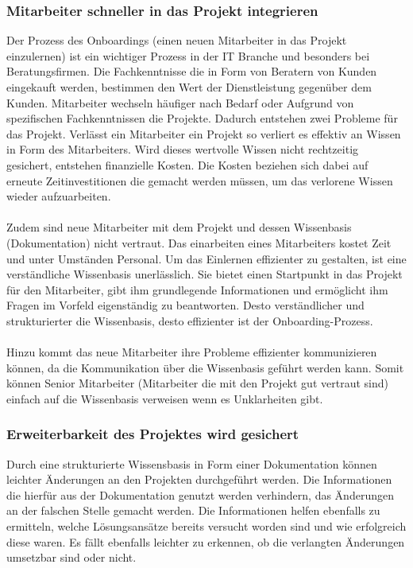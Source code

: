 \documentclass[a4paper,12pt]{scrartcl}
\begin{document}
\subsubsection{Mitarbeiter schneller in das Projekt integrieren} 
Der Prozess des Onboardings (einen neuen Mitarbeiter in das Projekt einzulernen) ist ein wichtiger Prozess in der IT Branche und besonders bei Beratungsfirmen. Die Fachkenntnisse die in Form von Beratern von Kunden eingekauft werden, bestimmen den Wert der Dienstleistung gegenüber dem Kunden. Mitarbeiter wechseln häufiger nach Bedarf oder Aufgrund von spezifischen Fachkenntnissen die Projekte. Dadurch entstehen zwei Probleme für das Projekt. Verlässt ein Mitarbeiter ein Projekt so verliert es effektiv an Wissen in Form des Mitarbeiters. Wird dieses wertvolle Wissen nicht rechtzeitig gesichert, entstehen finanzielle Kosten. Die Kosten beziehen sich dabei auf erneute Zeitinvestitionen die gemacht werden müssen, um das verlorene Wissen wieder aufzuarbeiten.
\\\\
Zudem sind neue Mitarbeiter mit dem Projekt und dessen Wissenbasis (Dokumentation) nicht vertraut. Das einarbeiten eines Mitarbeiters kostet Zeit und unter Umständen Personal. Um das Einlernen effizienter zu gestalten, ist eine verständliche Wissenbasis unerlässlich. Sie bietet einen Startpunkt in das Projekt für den Mitarbeiter, gibt ihm grundlegende Informationen und ermöglicht ihm Fragen im Vorfeld eigenständig zu beantworten. Desto verständlicher und strukturierter die Wissenbasis, desto effizienter ist der Onboarding-Prozess.   
\\\\
Hinzu kommt das neue Mitarbeiter ihre Probleme effizienter kommunizieren können, da die Kommunikation über die Wissenbasis geführt werden kann. Somit können Senior Mitarbeiter (Mitarbeiter die mit den Projekt gut vertraut sind) einfach auf die Wissenbasis verweisen wenn es Unklarheiten gibt. 

\subsubsection{Erweiterbarkeit des Projektes wird gesichert}
Durch eine strukturierte Wissensbasis in Form einer Dokumentation können leichter Änderungen an den Projekten durchgeführt werden. Die Informationen die hierfür aus der Dokumentation genutzt werden verhindern, das Änderungen an der falschen Stelle gemacht werden. Die Informationen helfen ebenfalls zu ermitteln, welche Lösungsansätze bereits versucht worden sind und wie erfolgreich diese waren. Es fällt ebenfalls leichter zu erkennen, ob die verlangten Änderungen umsetzbar sind oder nicht.
\end{document}
